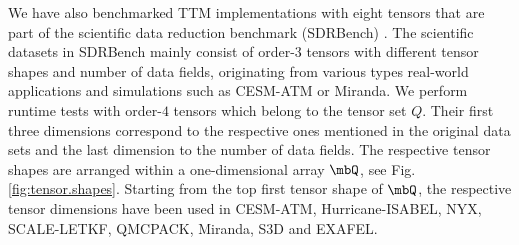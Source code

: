 We have also benchmarked TTM implementations with eight tensors that are part of the scientific data reduction benchmark (SDRBench) \cite{zhao:2020:sdrbench}.
The scientific datasets in SDRBench mainly consist of order-$3$ tensors with different tensor shapes and number of data fields, originating from various types real-world applications and simulations such as CESM-ATM or Miranda.
We perform runtime tests with order-$4$ tensors which belong to the tensor set $Q$.
Their first three dimensions correspond to the respective ones mentioned in the original data sets and the last dimension to the number of data fields.
The respective tensor shapes are arranged within a one-dimensional array $\mbQ$, see Fig. \ref{fig:tensor.shapes}.
Starting from the top first tensor shape of $\mbQ$, the respective tensor dimensions have been used in CESM-ATM, Hurricane-ISABEL, NYX, SCALE-LETKF, QMCPACK, Miranda, S3D and EXAFEL.










